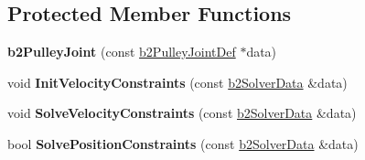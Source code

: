 \subsection*{Protected Member Functions}
\begin{DoxyCompactItemize}
\item 
{\bfseries b2\+Pulley\+Joint} (const \hyperlink{structb2_pulley_joint_def}{b2\+Pulley\+Joint\+Def} $\ast$data)\hypertarget{classb2_pulley_joint_aca1b8dc6fb05c134ccbc0423674c1867}{}\label{classb2_pulley_joint_aca1b8dc6fb05c134ccbc0423674c1867}

\item 
void {\bfseries Init\+Velocity\+Constraints} (const \hyperlink{structb2_solver_data}{b2\+Solver\+Data} \&data)\hypertarget{classb2_pulley_joint_a1b339ba58e82261beeb55f9ab04cfa7e}{}\label{classb2_pulley_joint_a1b339ba58e82261beeb55f9ab04cfa7e}

\item 
void {\bfseries Solve\+Velocity\+Constraints} (const \hyperlink{structb2_solver_data}{b2\+Solver\+Data} \&data)\hypertarget{classb2_pulley_joint_a517858e93e24f3daa51be4873b22c2c3}{}\label{classb2_pulley_joint_a517858e93e24f3daa51be4873b22c2c3}

\item 
bool {\bfseries Solve\+Position\+Constraints} (const \hyperlink{structb2_solver_data}{b2\+Solver\+Data} \&data)\hypertarget{classb2_pulley_joint_a8fcdd728e02b7c89372bf11b7732d976}{}\label{classb2_pulley_joint_a8fcdd728e02b7c89372bf11b7732d976}

\end{DoxyCompactItemize}
